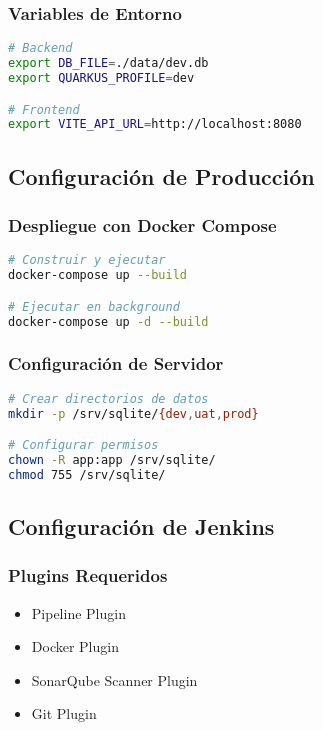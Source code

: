 \documentclass[12pt,a4paper]{article}
\begin{document}
\subsubsection{Variables de Entorno}
\begin{lstlisting}[language=bash]
# Backend
export DB_FILE=./data/dev.db
export QUARKUS_PROFILE=dev

# Frontend
export VITE_API_URL=http://localhost:8080
\end{lstlisting}

\subsection{Configuración de Producción}

\subsubsection{Despliegue con Docker Compose}
\begin{lstlisting}[language=bash]
# Construir y ejecutar
docker-compose up --build

# Ejecutar en background
docker-compose up -d --build
\end{lstlisting}

\subsubsection{Configuración de Servidor}
\begin{lstlisting}[language=bash]
# Crear directorios de datos
mkdir -p /srv/sqlite/{dev,uat,prod}

# Configurar permisos
chown -R app:app /srv/sqlite/
chmod 755 /srv/sqlite/
\end{lstlisting}

\subsection{Configuración de Jenkins}

\subsubsection{Plugins Requeridos}
\begin{itemize}
    \item Pipeline Plugin
    \item Docker Plugin
    \item SonarQube Scanner Plugin
    \item Git Plugin
\end{itemize}
\end{document}
